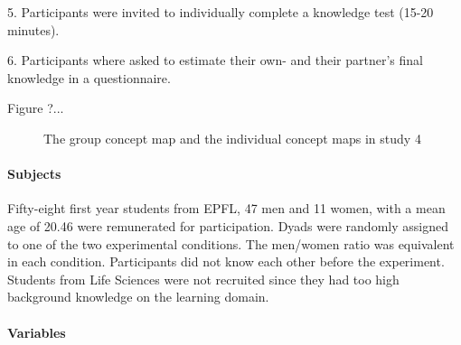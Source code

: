 \documentclass[twocolumn]{article}
\begin{document}
5. Participants were invited to individually complete a knowledge test (15-20
minutes). 

6. Participants where asked to estimate their own- and their partner’s final
knowledge in a questionnaire. 

Figure ?... 


\begin{figure}
    \centering
    \caption{The group concept map and the individual concept maps in study
    4}
    \label{study4:concept_map}
\end{figure}

\paragraph{Subjects}

Fifty-eight first year students from EPFL, 47 men and 11 women, with a mean age
of 20.46 were remunerated for participation. Dyads were randomly assigned to one
of the two experimental conditions. The men/women ratio was equivalent in each
condition. Participants did not know each other before the experiment. Students
from Life Sciences were not recruited since they had too high background
knowledge on the learning domain.

\paragraph{Variables}
\end{document}
